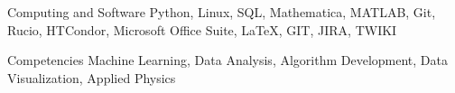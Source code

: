 
\begin{cvskills}
  \cvskill
    {Computing and Software} %
    {Python, Linux, SQL, Mathematica, MATLAB, Git, Rucio, HTCondor, Microsoft Office Suite, \LaTeX, GIT, JIRA, TWIKI} %

  \cvskill
    {Competencies} %
    {Machine Learning, Data Analysis, Algorithm Development, Data Visualization, Applied Physics} %

\end{cvskills}
